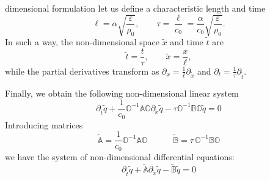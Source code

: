 \documentclass[
10pt, %
a4paper, %
oneside, %
headinclude,footinclude, %
table
]{scrartcl}
\begin{document}
dimensional 
formulation let us define a characteristic length and time 
\begin{equation}\label{CharacteristicSize}
\ell=\alpha  \sqrt{\frac{\varepsilon}{\rho_{0}}}, \quad\quad 
\tau=\frac{\ell}{c_{0}}=\frac{\alpha}{c_{0}}  \sqrt{\frac{\varepsilon}{\rho_{0}}}.
\end{equation}
In such a way, the non-dimensional space $ \tilde{x} $ and time $ \tilde{t} $ are
\begin{equation}\label{Rescaling}
\tilde{t}=\frac{t}{\tau}, \qquad \tilde{x}=\frac{x}{\ell},
\end{equation}
while the partial derivatives transform as $\partial_{x}=\frac{1}{\ell}\partial_{\tilde{x}}$ and 
$\partial_{t}=\frac{1}{\tau}\partial_{\tilde{t}}$. 

Finally, we obtain the following non-dimensional linear 
system 
\begin{equation}
\partial_{\tilde{t}}\tilde{q}+\frac{1}{c_{0}}\mathbb{O}^{-1}\mathbb{A}\mathbb{O}\partial_{\tilde{x}}\tilde{q}-\tau \mathbb{O}^{-1}\mathbb{B}\mathbb{O}\tilde{q}=0
\end{equation}
Introducing matrices
\begin{equation}\label{nondim.matrices}
\tilde{\mathbb{A}} = \frac{1}{c_{0}}\mathbb{O}^{-1}\mathbb{A}\mathbb{O}
\quad\quad\quad
\tilde{\mathbb{B}} = \tau\,\mathbb{O}^{-1}\mathbb{B}\mathbb{O}
\end{equation}
we have the system of non-dimensional differential equations:
\begin{equation}\label{SystDiffAdim}
\boxed{\partial_{\tilde{t}}\tilde{q}+\tilde{\mathbb{A}}\partial_{\tilde{x}}\tilde{q}-\tilde{\mathbb{B}}\tilde{q}=0}
\end{equation}
\end{document}
